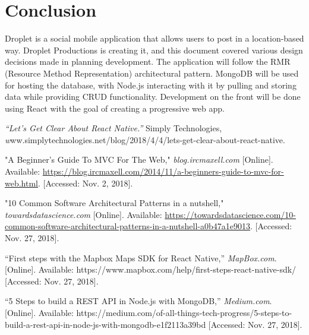 \documentclass[draftclsnofoot, onecolumn, letterpaper,10pt,compsoc]{IEEEtran}
\begin{document}
\newpage
\section{Conclusion}

Droplet is a social mobile application that allows users to post in a location-based way. Droplet Productions is creating it, and this document covered various design decisions made in planning development. The application will follow the RMR (Resource Method Representation) architectural pattern. MongoDB will be used for hosting the database, with Node.js interacting with it by pulling and storing data while providing CRUD functionality. Development on the front will be done using React with the goal of creating a progressive web app. 

\newpage
\begin{thebibliography}{10}
\textit{“Let's Get Clear About React Native.”} Simply Technologies, \textit www.simplytechnologies.net/blog/2018/4/4/lets-get-clear-about-react-native.


"A Beginner's Guide To MVC For The Web,"
\textit{blog.ircmaxell.com}
[Online]. Available: \url{https://blog.ircmaxell.com/2014/11/a-beginners-guide-to-mvc-for-web.html}.
[Accessed: Nov.  2, 2018].

"10 Common Software Architectural Patterns in a nutshell,"
\textit{towardsdatascience.com}
[Online]. Available: \url{https://towardsdatascience.com/10-common-software-architectural-patterns-in-a-nutshell-a0b47a1e9013}.
[Accessed: Nov.  27, 2018].

“First steps with the Mapbox Maps SDK for React Native,” 
\textit{MapBox.com}. 
[Online]. Available: https://www.mapbox.com/help/first-steps-react-native-sdk/ [Accessed: Nov. 27, 2018].

“5 Steps to build a REST API in Node.js with MongoDB,” 
\textit{Medium.com}. 
[Online]. Available: https://medium.com/of-all-things-tech-progress/5-steps-to-build-a-rest-api-in-node-js-with-mongodb-e1f2113a39bd [Accessed: Nov. 27, 2018].

\end{thebibliography}
\end{document}
